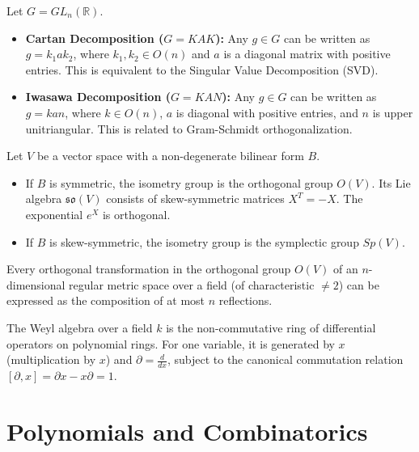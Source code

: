 \begin{theorem}
Let $G = GL_n(\mathbb{R})$.
\begin{itemize}
    \item \textbf{Cartan Decomposition ($G = KAK$):} Any $g \in G$ can be written as $g = k_1 a k_2$, where $k_1, k_2 \in O(n)$ and $a$ is a diagonal matrix with positive entries. This is equivalent to the Singular Value Decomposition (SVD).
    \item \textbf{Iwasawa Decomposition ($G = KAN$):} Any $g \in G$ can be written as $g = k a n$, where $k \in O(n)$, $a$ is diagonal with positive entries, and $n$ is upper unitriangular. This is related to Gram-Schmidt orthogonalization.
\end{itemize}
\end{theorem}

\begin{definition}
Let $V$ be a vector space with a non-degenerate bilinear form $B$. 
\begin{itemize}
    \item If $B$ is symmetric, the isometry group is the orthogonal group $O(V)$. Its Lie algebra $\mathfrak{so}(V)$ consists of skew-symmetric matrices $X^T = -X$. The exponential $e^X$ is orthogonal.
    \item If $B$ is skew-symmetric, the isometry group is the symplectic group $Sp(V)$.
\end{itemize}
\end{definition}

\begin{theorem}
Every orthogonal transformation in the orthogonal group $O(V)$ of an $n$-dimensional regular metric space over a field (of characteristic $\neq 2$) can be expressed as the composition of at most $n$ reflections.
\end{theorem}

\begin{definition}
The Weyl algebra over a field $k$ is the non-commutative ring of differential operators on polynomial rings. For one variable, it is generated by $x$ (multiplication by $x$) and $\partial = \frac{d}{dx}$, subject to the canonical commutation relation $[\partial, x] = \partial x - x \partial = 1$.
\end{definition}

\section{Polynomials and Combinatorics}


